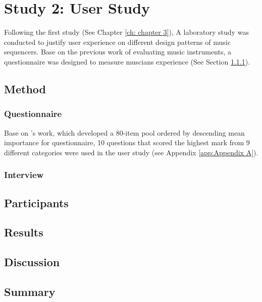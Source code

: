 \chapter{Study 2: User Study}

Following the first study (See Chapter \ref{ch: chapter 3}), A laboratory study was conducted to justify user experience on different design patterns of music sequencers. Base on the previous work of evaluating music instruments, a questionnaire was designed to measure muscians experience (See Section \ref{subsec: questionnaire}).

\section{Method}
\subsection{Questionnaire}
\label{subsec: questionnaire}

Base on \citeauthor{Reference0}'s work, which developed a 80-item pool ordered by descending mean importance for questionnaire, 10 questions that scored the highest mark from 9 different categories were used in the user study (see Appendix \ref{app:Appendix A}). 

\subsection{Interview}

\section{Participants}



\section{Results}

\section{Discussion}

\section{Summary}
